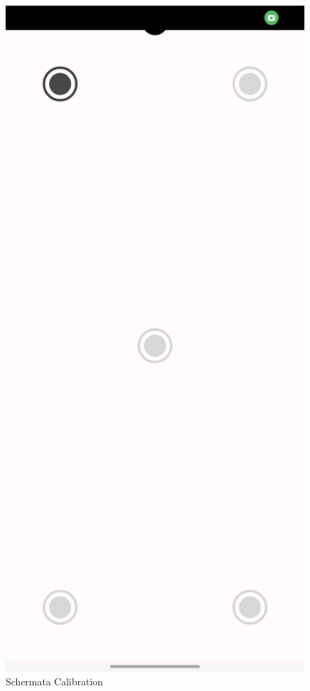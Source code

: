 \documentclass[11pt]{article}
\begin{document}
\begin{figure}[h]
\caption{Schermata Calibration}
\centering
\includegraphics[scale=0.2]{img/CameraApp_Screen_calibration.jpg}
\end{figure}
\end{document}
